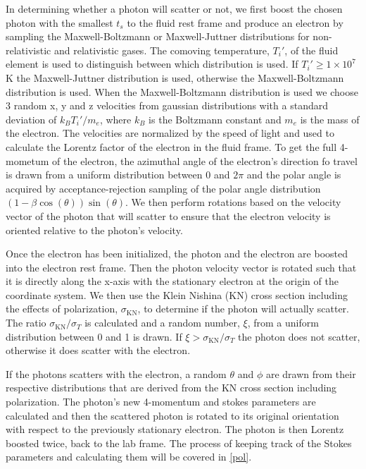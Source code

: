 \documentclass[12pt,a4paper]{article}
\begin{document}
In determining whether a photon will scatter or not, we first boost the chosen photon with the smallest $t_s$ to the fluid rest frame and produce an electron by sampling the Maxwell-Boltzmann or Maxwell-Juttner distributions for non-relativistic and relativistic gases. The comoving temperature, $T_i'$, of the fluid element is used to distinguish between which distribution is used. If $T_i' \ge 1 \times 10^7$ K the Maxwell-Juttner distribution is used, otherwise the Maxwell-Boltzmann distribution is used. When the Maxwell-Boltzmann distribution is used we choose 3 random x, y and z velocities from gaussian distributions with a standard deviation of $k_BT_i'/m_e$, where $k_B$ is the Boltzmann constant and $m_e$ is the mass of the electron. The velocities are normalized by the speed of light and used to calculate the Lorentz factor of the electron in the fluid frame. To get the full 4-mometum of the electron, the azimuthal angle of the electron's direction fo travel is drawn from a uniform distribution between 0 and $2\pi$ and the polar angle is acquired by acceptance-rejection sampling of the polar angle distribution $(1-\beta\cos(\theta))\sin(\theta) $. We then perform rotations based on the velocity vector of the photon that will scatter to ensure that the electron velocity is oriented relative to the photon's velocity.

Once the electron has been initialized, the photon and the electron are boosted into the electron rest frame. Then the photon velocity vector is rotated such that it is directly along the x-axis with the stationary electron at the origin of the coordinate system. We then use the Klein Nishina (KN) cross section including the effects of polarization, $\sigma_\mathrm{KN}$, to determine if the photon will actually scatter. The ratio $\sigma_\mathrm{KN}/\sigma_T$ is calculated and a random number, $\xi$, from a uniform distribution between 0 and 1 is drawn. If $\xi >\sigma_\mathrm{KN}/\sigma_T $ the photon does not scatter, otherwise it does scatter with the electron. 

If the photons scatters with the electron, a random $\theta$ and $\phi$ are drawn from their respective distributions that are derived from the KN cross section including polarization. The photon's new 4-momentum and stokes parameters are calculated and then the scattered photon is rotated to its original orientation with respect to the previously stationary electron. The photon is then Lorentz boosted twice, back to the lab frame. The process of keeping track of the Stokes parameters and calculating them will be covered in \autoref{pol}.
\end{document}
